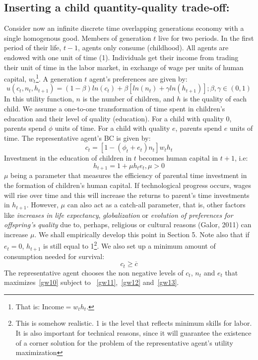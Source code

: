 \documentclass[12pt]{article}%
\begin{document}
\subsection{Inserting a child quantity-quality trade-off:}
Consider now an infinite discrete time overlapping generations economy with a single homogenous good. Members of generation $t$ live for two periods. In the first period of their life, $t-1$, agents only consume (childhood). All agents are endowed with one unit of time (1). Individuals get their income from trading their unit of time in the labor market, in exchange of wage per units of human capital, $w_{t}$\footnote{That is: Income$=w_{t}h_{t}$.}. A generation $t$ agent's preferences are given by:
\begin{equation}\label{gw10}
u(c_{t},n_{t},h_{t+1})=(1-\beta)ln(c_{t})+\beta[ln(n_{t})+\gamma ln(h_{t+1})]; \beta,\gamma\in(0,1)
\end{equation}
In this utility function, $n$ is the number of children, and $h$ is the quality of each child. We assume a one-to-one transformation of time spent in children's education and their level of quality (education). For a child with quality $0$, parents spend $\phi$ units of time. For a child with quality $e$, parents spend $e$ units of time. The representative agent's BC is given by:
\begin{equation}\label{gw11}
c_{t}=[1-(\phi_{t}+e_{t})n_{t}]w_{t}h_{t}
\end{equation}
Investment in the education of children in $t$ becomes human capital in $t+1$, i.e:
\begin{equation}\label{gw12}
h_{t+1}=1+\mu h_{t}e_{t}, \mu>0
\end{equation}
$\mu$ being a parameter that measures the efficiency of parental time investment in the formation of children's human capital. If technological progress occurs, wages will rise over time and this will increase the returns to parent's time investments in $h_{t+1}$. However, $\mu$  can also act as a catch-all parameter, that is, other factors like \emph{increases in life expectancy}, \emph{globalization} or \emph{evolution of preferences for offspring's quality} due to, perhaps, religious or cultural reasons (Galor, 2011) can increase $\mu$. We shall empirically develop this point in Section 5. Note also that if $e_{t}=0$, $h_{t+1}$ is still equal to 1\footnote{This is somehow realistic. 1 is the level that reflects minimum skills for labor. It is also important for technical reasons, since it will guarantee the existence of a corner solution for the problem of the representative agent's utility maximization}. We also set up a minimum amount of consumption needed for survival:
\begin{equation}\label{gw13}
c_{t}\geq \overline{c}
\end{equation}
The representative agent chooses the non negative levels of $c_{t}$, $n_{t}$ and $e_{t}$ that maximizes~\ref{gw10} subject to ~\ref{gw11},~\ref{gw12} and~\ref{gw13}.
\end{document}
